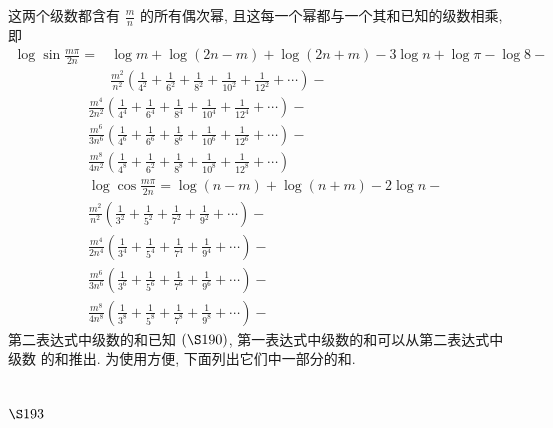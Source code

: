 这两个级数都含有 $\frac{m}{n}$ 的所有偶次幂, 且这每一个幂都与一个其和已知的级数相乘, 即
\[
\begin{aligned}
\log \sin \frac{m \pi}{2 n}= & \log m+\log (2 n-m)+\log (2 n+m)-3 \log n+\log \pi-\log 8- \\
& \frac{m^{2}}{n^{2}}\left(\frac{1}{4^{2}}+\frac{1}{6^{2}}+\frac{1}{8^{2}}+\frac{1}{10^{2}}+\frac{1}{12^{2}}+\cdots\right)-
\end{aligned}
\]
\[
\begin{aligned}
& \frac{m^{4}}{2 n^{2}}\left(\frac{1}{4^{4}}+\frac{1}{6^{4}}+\frac{1}{8^{4}}+\frac{1}{10^{4}}+\frac{1}{12^{4}}+\cdots\right)- \\
& \frac{m^{6}}{3 n^{6}}\left(\frac{1}{4^{6}}+\frac{1}{6^{6}}+\frac{1}{8^{6}}+\frac{1}{10^{6}}+\frac{1}{12^{6}}+\cdots\right)- \\
& \frac{m^{8}}{4 n^{2}}\left(\frac{1}{4^{8}}+\frac{1}{6^{2}}+\frac{1}{8^{8}}+\frac{1}{10^{8}}+\frac{1}{12^{8}}+\cdots\right) \\
& \log \cos \frac{m \pi}{2 n}=\log (n-m)+\log (n+m)-2 \log n- \\
& \frac{m^{2}}{n^{2}}\left(\frac{1}{3^{2}}+\frac{1}{5^{2}}+\frac{1}{7^{2}}+\frac{1}{9^{2}}+\cdots\right)- \\
& \frac{m^{4}}{2 n^{4}}\left(\frac{1}{3^{4}}+\frac{1}{5^{4}}+\frac{1}{7^{4}}+\frac{1}{9^{4}}+\cdots\right)- \\
& \frac{m^{6}}{3 n^{6}}\left(\frac{1}{3^{6}}+\frac{1}{5^{6}}+\frac{1}{7^{6}}+\frac{1}{9^{6}}+\cdots\right)- \\
& \frac{m^{8}}{4 n^{8}}\left(\frac{1}{3^{8}}+\frac{1}{5^{8}}+\frac{1}{7^{8}}+\frac{1}{9^{8}}+\cdots\right)-
\end{aligned}
\]
第二表达式中级数的和已知 $(\S 190)$, 第一表达式中级数的和可以从第二表达式中级数 的和推出. 为使用方便, 下面列出它们中一部分的和.

\section{$\S 193$}

